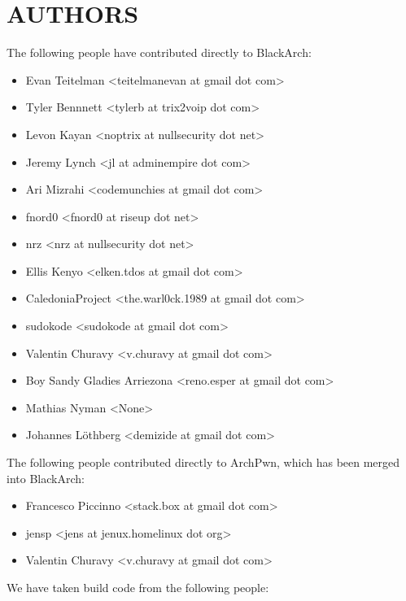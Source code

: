 \section{AUTHORS}
The following people have contributed directly to BlackArch:
\begin{itemize}
\item Evan Teitelman <teitelmanevan at gmail dot com>
\item Tyler Bennnett <tylerb at trix2voip dot com>
\item Levon Kayan <noptrix at nullsecurity dot net>
\item Jeremy Lynch <jl at adminempire dot com>
\item Ari Mizrahi <codemunchies at gmail dot com>
\item fnord0 <fnord0 at riseup dot net>
\item nrz <nrz at nullsecurity dot net>
\item Ellis Kenyo <elken.tdos at gmail dot com>
\item CaledoniaProject <the.warl0ck.1989 at gmail dot com>
\item sudokode <sudokode at gmail dot com>
\item Valentin Churavy <v.churavy at gmail dot com>
\item Boy Sandy Gladies Arriezona <reno.esper at gmail dot com>
\item Mathias Nyman <None>
\item Johannes Löthberg <demizide at gmail dot com>
\end{itemize}
The following people contributed directly to ArchPwn, which has been merged
into BlackArch:
\begin{itemize}
\item Francesco Piccinno <stack.box at gmail dot com>
\item jensp <jens at jenux.homelinux dot org>
\item Valentin Churavy <v.churavy at gmail dot com>
\end{itemize}
We have taken build code from the following people:
